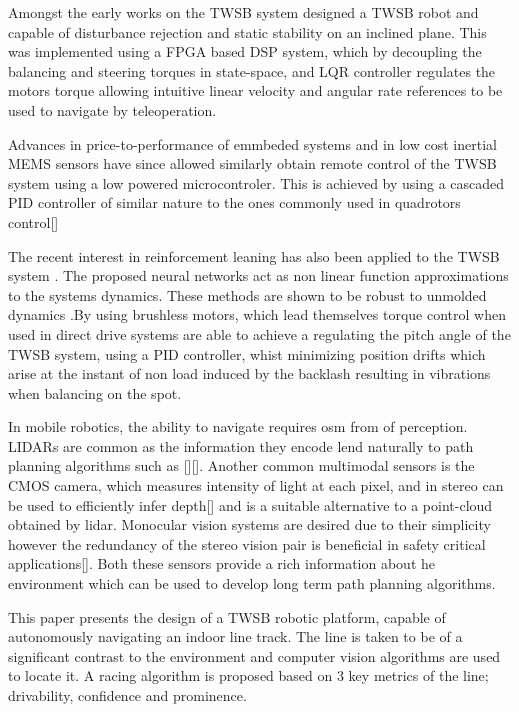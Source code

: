     Amongst the early works on the TWSB system \cite{grasser2002joe} designed a TWSB robot 
    and capable of disturbance rejection and static stability on an inclined plane.
    This was implemented using a FPGA based DSP system, which by decoupling the balancing and steering torques in
    state-space, and LQR controller regulates the motors torque allowing intuitive linear velocity 
    and angular rate references to be used to navigate by teleoperation.
    
    Advances in price-to-performance of emmbeded systems and in low cost inertial MEMS sensors \cite{MEMS} 
    have since allowed \cite{juang2013design} \cite{Velazquez2016VelocityAM} similarly 
    obtain remote control of the TWSB system using a low powered microcontroler.
    This is achieved by using a cascaded PID controller  of similar nature to the 
    ones commonly used in quadrotors control[]

    The recent interest in reinforcement leaning has also been applied to the TWSB system \cite{kober2013reinforcement}. 
    The proposed neural networks act as non linear function approximations to the systems dynamics. These methods 
    are shown to be robust to unmolded dynamics \cite{guo2021optimal}.By using brushless motors, 
    which lead themselves torque control when used in direct drive systems are able to achieve a
    regulating the pitch angle of the TWSB system,
    using a PID controller, whist minimizing position drifts which arise at the instant of 
    non load induced by the backlash resulting in vibrations when balancing on the spot. 

    In mobile robotics, the ability to navigate requires osm from of perception. LIDARs are common as the information 
    they encode lend naturally to path planning algorithms such as [][]. Another common multimodal 
    sensors is the CMOS camera, which measures intensity of light at each pixel, and in stereo can be used
    to efficiently infer depth[] and is a suitable alternative to a point-cloud obtained by lidar. Monocular 
    vision systems are desired due to their simplicity however the redundancy of the stereo vision pair is 
    beneficial in safety critical applications[]. Both these sensors provide a rich information 
    about he environment which can be used to develop  long term path planning algorithms. 
    
    This paper presents the design of a TWSB robotic platform, capable of autonomously navigating an indoor line track. 
    The line is taken to be of a significant contrast to the environment and computer vision algorithms are used to 
    locate it. A racing algorithm is proposed based on 3 key metrics of the line; drivability, confidence and prominence.

